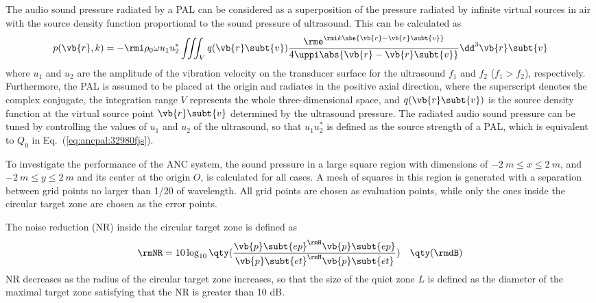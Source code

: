 The audio sound pressure radiated by a PAL can be considered as a superposition of the pressure radiated by infinite virtual sources in air with the source density function proportional to the sound pressure of ultrasound. 
This can be calculated as
\begin{equation}
    p(\vb{r}, k)
    =
    -\rmi \rho_0\omega
    u_1u_2^* 
    \iiint_V
    q(\vb{r}\subt{v})
    \frac{\rme^{\rmi k \abs{\vb{r}-\vb{r}\subt{v}}}}{4\uppi \abs{\vb{r}-\vb{r}\subt{v}}}
    \dd^3 \vb{r}\subt{v}
\end{equation}
where $u_1$ and $u_2$ are the amplitude of the vibration velocity on the transducer surface for the ultrasound $f_1$ and $f_2$ ($f_1 > f_2$), respectively. 
Furthermore, the PAL is assumed to be placed at the origin and radiates in the positive axial direction, where the superscript \quotes{*} denotes the complex conjugate, the integration range $V$ represents the whole three-dimensional space, and $q(\vb{r}\subt{v})$ is the source density function at the virtual source point $\vb{r}\subt{v}$ determined by the ultrasound pressure. 
The radiated audio sound pressure can be tuned by controlling the values of $u_1$ and $u_2$ of the ultrasound, so that $u_1u_2^*$ is defined as the source strength of a PAL, which is equivalent to $Q_0$ in Eq.~(\ref{eq:ancpal:32980fjs}).

To investigate the performance of the ANC system, the sound pressure in a large square region with dimensions of $\SI{-2}{m} \leq x \leq \SI{2}{m}$, and $\SI{-2}{m}\leq y \leq \SI{2}{m}$ and its center at the origin $O$, is calculated for all cases. 
A mesh of squares in this region is generated with a separation between grid points no larger than 1/20 of wavelength. 
All grid points are chosen as evaluation points, while only the ones inside the circular target zone are chosen as the error points. 

The noise reduction (NR) inside the circular target zone is defined as
\begin{equation}
    \rmNR 
    =
    10\log_{10}
    \qty(\frac{\vb{p}\subt{ep}^\rmH \vb{p}\subt{ep}}{\vb{p}\subt{et}^\rmH \vb{p}\subt{et}})
    \quad
    \qty(\rmdB)
\end{equation}
NR decreases as the radius of the circular target zone increases, so that the size of the quiet zone $L$ is defined as the diameter of the maximal target zone satisfying that the NR is greater than 10 dB. 

